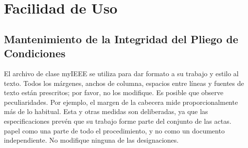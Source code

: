 \section{Facilidad de Uso} \label{sec:facilidad_uso}

\subsection{Mantenimiento de la Integridad del Pliego de Condiciones} \label{subec:mante_integ}

El archivo de clase myIEEE se utiliza para dar formato a su trabajo y estilo al texto. Todos los márgenes, anchos de columna, espacios entre líneas y fuentes de texto están prescritos; por favor, no los modifique. Es posible que observe peculiaridades. Por ejemplo, el margen de la cabecera mide proporcionalmente más de lo habitual. Esta y otras medidas son deliberadas, ya que las especificaciones prevén que su trabajo forme parte del conjunto de las actas. papel como una parte de todo el procedimiento, y no como un documento independiente. No modifique ninguna de las designaciones. \par